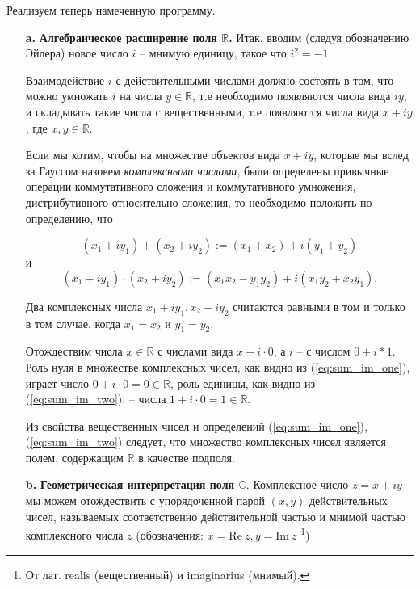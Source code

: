 \documentclass[a4paper, 12pt]{extarticle} %
\begin{document}
Реализуем теперь намеченную программу.
\begin{enumerate}
    \item [\textbf{a.}] \textbf{Алгебраическое расширение поля $\mathbb{R}$.} Итак, вводим (следуя обозначению Эйлера) новое число $i$ -- мнимую единицу, такое что $i^2 = -1$.

          Взаимодействие $i$ с действительными числами должно состоять в том, что можно умножать $i$ на числа $y \in \mathbb{R}$, т.е необходимо появляются числа вида $iy$, и складывать такие числа с вещественными, т.е появляются числа вида $x + iy$, где $x, y \in \mathbb{R}$.

          Если мы хотим, чтобы на множестве объектов вида $x + iy$, которые мы вслед за Гауссом назовем \textit{компле$\acute{}$ксными числами}, были определены привычные операции коммутативного сложения и коммутативного умножения, дистрибутивного относительно сложения, то необходимо положить по определению, что

          \begin{equation}
              (x_1 + iy_1) + (x_2 + iy_2) := (x_1 + x_2) + i(y_1 + y_2)
              \label{eq:sum_im_one}
          \end{equation}
          и
          \begin{equation}
              (x_1 + iy_1) \cdot (x_2 + iy_2) := (x_1 x_2 - y_1 y_2) + i(x_1 y_2 + x_2 y_1).
              \label{eq:sum_im_two}
          \end{equation}

          Два комплексных числа $x_1 + iy_1, x_2 + iy_2$ считаются равными в том и только в том случае, когда $x_1 = x_2$ и $y_1 = y_2$.

          Отождествим числа $x \in \mathbb{R}$ с числами вида $x + i \cdot 0$, а $i$ -- с числом $0 + i * 1$. Роль нуля в множестве комплексных чисел, как видно из (\ref{eq:sum_im_one}), играет число $0 + i \cdot 0 = 0 \in \mathbb{R}$, роль единицы, как видно из (\ref{eq:sum_im_two}), -- числа $1 + i \cdot 0 = 1 \in \mathbb{R}$.

          Из свойства вещественных чисел и определений (\ref{eq:sum_im_one}), (\ref{eq:sum_im_two}) следует, что множество комплексных чисел является полем, содержащим $\mathbb{R}$ в качестве подполя.

    \item [\textbf{b.}] \textbf{Геометрическая интерпретация поля $\mathbb{C}$}. Комплексное число $z = x + iy$ мы можем отождествить с упорядоченной парой $(x, y)$ действительных чисел, называемых соответственно действительной частью и мнимой частью компле$\acute{}$ксного числа $z$ (обозначения: $x = \mathrm{Re} \ z, y = \mathrm{Im} \ z$ \footnote{От лат. realis (вещественный) и imaginarius (мнимый).})


\end{enumerate}
\end{document}
